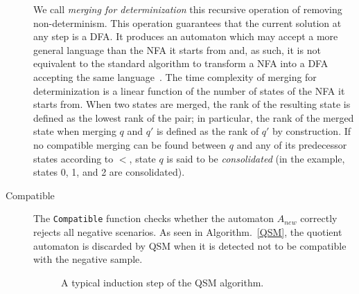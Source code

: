 \begin{description}
We call \textsl{merging for determinization} this recursive operation of removing non-determinism. This operation guarantees that the current solution at any step is a DFA. It produces an automaton which may accept a more general language than the NFA it starts from and, as such, it is not equivalent to the standard algorithm to transform a NFA into a DFA accepting the same language~\cite{Hopcroft79}. 
The time complexity of merging for determinization is a linear function of the number of states of the NFA it starts from. 
When two states are merged, the rank of the resulting state is defined as the lowest rank of the pair; in particular, the rank of the merged state when merging $q$ and $q'$ is defined as the rank of $q'$ by construction. If no compatible merging can be found between $q$ and any of its predecessor states according to $<$, state $q$ is said to be \textsl{consolidated} (in the example, states 0, 1, and 2 are consolidated).

\item[Compatible] The \texttt{Compatible} function checks whether the automaton $A_{new}$ correctly rejects all negative scenarios. As seen in Algorithm.~\ref{QSM}, the quotient automaton is discarded by \textsc{QSM} when it is detected not to be compatible with the negative sample.

\begin{figure}[H]
\hspace*{-1cm}
\begin{center}
\end{center}
\caption{A typical induction step of the \textsc{QSM} algorithm\label{Fig:algo:steps}.}
\end{figure}

\end{description}

